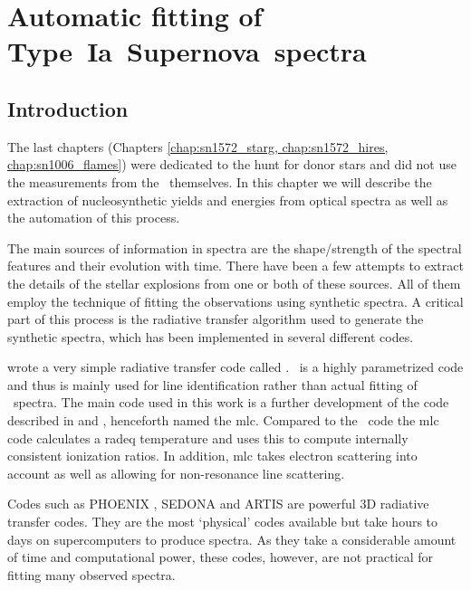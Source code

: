 \chapter{Automatic fitting of Type~Ia~Supernova~spectra}
\label{chap:dalek}
\section{Introduction}
\label{sec:dalek_intro}

The last chapters (Chapters \ref{chap:sn1572_starg, chap:sn1572_hires, chap:sn1006_flames}) were dedicated to the hunt for donor stars and did not use the measurements from the \sneia\ themselves. In this chapter we will describe the extraction of nucleosynthetic yields and energies from optical spectra as well as the automation of this process.

The main sources of information in spectra are the shape/strength of the spectral features and their evolution with time. There have been a few attempts to extract the details of the stellar explosions from one or both of these sources. All of them employ the technique of fitting the observations using synthetic spectra. A critical part of this process is the radiative transfer algorithm used to generate the synthetic spectra, which has been implemented in several different codes.


\cite{2000PhDT.........6F} wrote a very simple radiative transfer code called \synow. \synow\ is a highly parametrized code and thus is mainly used for line identification rather than actual fitting of \snia\ spectra. 
The main code used in this work is a further development of the code described in \citet{1993A&A...279..447M}  and \citet{2000A&A...363..705M}, henceforth named the \gls{mlc}. Compared to the \synow\ code the \gls{mlc} code calculates a \gls{radeq} temperature and uses this to compute internally consistent ionization ratios. In addition, \gls{mlc} takes electron scattering into account as well as allowing for non-resonance line scattering. 

Codes such as PHOENIX \cite{1999JCoAM.109...41H}, SEDONA \cite{2006ApJ...651..366K} and ARTIS \cite{2009MNRAS.398.1809K} are powerful 3D radiative transfer codes. They are the most `physical' codes available but take hours to days on supercomputers to produce spectra. As they take a considerable amount of time and computational power, these codes, however, are not practical for fitting many observed spectra.

